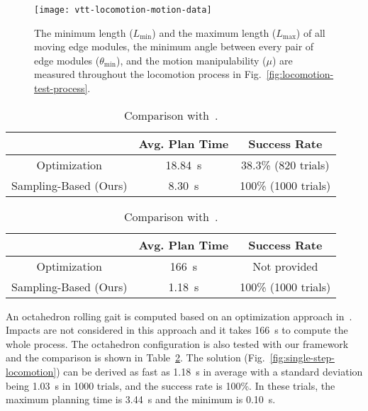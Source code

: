 \documentclass[journal]{IEEEtran}
\begin{document}
\begin{figure}[t!]
  \centering
  \texttt{[image: vtt-locomotion-motion-data]}
  \caption{The minimum length ($L_{\min}$) and the maximum length
    ($L_{\max}$) of all moving edge modules, the minimum angle between
    every pair of edge modules ($\theta_{\min}$), and the motion
    manipulability ($\mu$) are measured throughout the locomotion
    process in Fig.~\ref{fig:locomotion-test-process}.}
  \label{fig:vtt-locomotion-data}
\end{figure}

\begin{table}[t!]
  \centering
  \caption{Comparison with~\cite{Park-vtt-locomotion-ral-2020}.}
  \begin{tabular}{ccc}
    \toprule
    &Avg. Plan Time&Success Rate\\
    \midrule
    Optimization&\SI{18.84}{s}&38.3\% (820 trials)\\
    Sampling-Based (Ours)&\SI{8.30}{s}&100\% (1000 trials)\\
    \bottomrule
  \end{tabular}
  \label{tab:comp-park}
\end{table}

\begin{table}[t!]
  \centering
  \caption{Comparison with~\cite{Usevitch-lar-locomotion-tro-2020}.}
  \begin{tabular}{ccc}
    \toprule
    &Avg. Plan Time&Success Rate\\
    \midrule
    Optimization&\SI{166}{s}&Not provided\\
    Sampling-Based (Ours)&\SI{1.18}{s}&100\% (1000 trials)\\
    \bottomrule
  \end{tabular}
  \label{tab:comp-use}
\end{table}

An octahedron rolling gait is computed based on an optimization
approach in~\cite{Usevitch-lar-locomotion-tro-2020}. Impacts are not
considered in this approach and it takes \SI{166}{s} to compute the
whole process. The octahedron configuration is also tested with our
framework and the comparison is shown in Table~\ref{tab:comp-use}. The
solution (Fig.~\ref{fig:single-step-locomotion}) can be derived as
fast as \SI{1.18}{s} in average with a standard deviation being
\SI{1.03}{s} in 1000 trials, and the success rate is 100\%. In these
trials, the maximum planning time is \SI{3.44}{s} and the minimum is
\SI{0.10}{s}.
\end{document}
